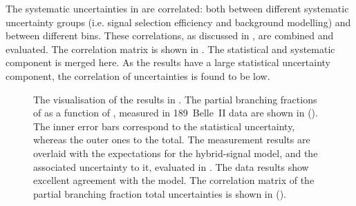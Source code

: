 The systematic uncertainties in  are correlated:
both between different systematic uncertainty groups (i.e. signal selection efficiency and background modelling)
and between different \EB bins.
These correlations, as discussed in , are combined and evaluated.
The correlation matrix is shown in .
The statistical and systematic component is merged here.
As the results have a large statistical uncertainty component, the correlation of uncertainties is found to be low.
\begin{figure}[hbtp!]
    \centering
    \caption{\label{fig:partial_and_correlation} 
    The visualisation of the results in .
    The partial branching fractions of \BtoXsgamma 
    as a function of \EB, measured in 189~\invfb Belle~II data are shown in ().
    The inner error bars correspond to the statistical uncertainty, whereas the outer ones to the total.
    The measurement results are overlaid with the expectations for the hybrid-signal model, and the associated uncertainty to it, evaluated in .
    The data results show excellent agreement with the model.
    The correlation matrix of the partial branching fraction total uncertainties is shown in ().
    }
\end{figure}

